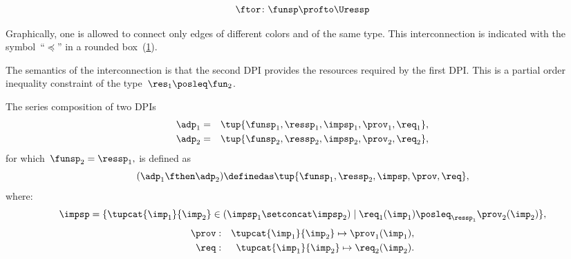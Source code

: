 {\begin{forslides}
        \begin{equation}
            \label{eq:dprob2}
            \ftor \colon \funsp \profto \Uressp
        \end{equation}
    \end{forslides}
}

Graphically, one is allowed to connect only edges of different colors and of the same type.
This interconnection is indicated with the symbol~``$\preceq$'' in a rounded box~(\cref{fig:connection}).

\begin{figure}[h]
    \centering
    \caption{\label{fig:connection}}
\end{figure}


The semantics of the interconnection is that the second DPI provides the resources required by the first DPI.
This is a partial order inequality constraint of the type~$\res_{1}\posleq\fun_{2}$.

\begin{definition}
    \label{def:series-composition}
    The series composition of two DPIs
    \begin{equation}
        \begin{aligned}
            \adp_{1}&=&\tup{\funsp_{1},\ressp_{1},\impsp_{1},\prov_{1},\req_{1}},
            \\
            \adp_{2}&=&\tup{\funsp_{2},\ressp_{2},\impsp_{2},\prov_{2},\req_{2}},
        \end{aligned}
    \end{equation}
    for which~$\funsp_{2}=\ressp_{1},$ is defined as
    \begin{equation}
    (\adp_{1} \fthen \adp_{2})
        \definedas
        \tup{ \funsp_{1},\ressp_{2},\impsp,\prov,\req},
    \end{equation}
    where:
    \begin{equation}
        \impsp  =  \{  \tupcat {\imp_{1}} {\imp_{2}} \in (\impsp_{1} \setconcat \impsp_{2})\mid\req_{1}(\imp_{1})\posleq_{\ressp_{1}}\prov_{2}(\imp_{2})\},
    \end{equation}
    \begin{equation}
        \begin{aligned}
            \prov & : & \tupcat {\imp_{1}} {\imp_{2}}   \mapsto\prov_{1}(\imp_{1}),\\
            \req & : & \tupcat {\imp_{1}} {\imp_{2}} \mapsto\req_{2}(\imp_{2}).
        \end{aligned}
    \end{equation}
\end{definition}

